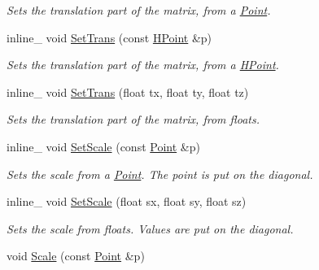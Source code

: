 \begin{DoxyCompactItemize}
\begin{DoxyCompactList}\small\item\em Sets the translation part of the matrix, from a \hyperlink{class_point}{Point}. \end{DoxyCompactList}\item 
\hypertarget{class_matrix4x4_a8eb35a06a0ebcc627400e28b078be014}{inline\+\_\+ void \hyperlink{class_matrix4x4_a8eb35a06a0ebcc627400e28b078be014}{Set\+Trans} (const \hyperlink{class_h_point}{H\+Point} \&p)}\label{class_matrix4x4_a8eb35a06a0ebcc627400e28b078be014}

\begin{DoxyCompactList}\small\item\em Sets the translation part of the matrix, from a \hyperlink{class_h_point}{H\+Point}. \end{DoxyCompactList}\item 
\hypertarget{class_matrix4x4_ac32b709a0cdad07a3f81194cad4fa617}{inline\+\_\+ void \hyperlink{class_matrix4x4_ac32b709a0cdad07a3f81194cad4fa617}{Set\+Trans} (float tx, float ty, float tz)}\label{class_matrix4x4_ac32b709a0cdad07a3f81194cad4fa617}

\begin{DoxyCompactList}\small\item\em Sets the translation part of the matrix, from floats. \end{DoxyCompactList}\item 
\hypertarget{class_matrix4x4_a3b2357c0ca9ecde2ceb834fd067d2124}{inline\+\_\+ void \hyperlink{class_matrix4x4_a3b2357c0ca9ecde2ceb834fd067d2124}{Set\+Scale} (const \hyperlink{class_point}{Point} \&p)}\label{class_matrix4x4_a3b2357c0ca9ecde2ceb834fd067d2124}

\begin{DoxyCompactList}\small\item\em Sets the scale from a \hyperlink{class_point}{Point}. The point is put on the diagonal. \end{DoxyCompactList}\item 
\hypertarget{class_matrix4x4_a38e74ddf318a3fa279522cf646174daa}{inline\+\_\+ void \hyperlink{class_matrix4x4_a38e74ddf318a3fa279522cf646174daa}{Set\+Scale} (float sx, float sy, float sz)}\label{class_matrix4x4_a38e74ddf318a3fa279522cf646174daa}

\begin{DoxyCompactList}\small\item\em Sets the scale from floats. Values are put on the diagonal. \end{DoxyCompactList}\item 
\hypertarget{class_matrix4x4_aaeba89274dce846ba331e1cbd7c84ecb}{void \hyperlink{class_matrix4x4_aaeba89274dce846ba331e1cbd7c84ecb}{Scale} (const \hyperlink{class_point}{Point} \&p)}\label{class_matrix4x4_aaeba89274dce846ba331e1cbd7c84ecb}


\end{DoxyCompactItemize}
